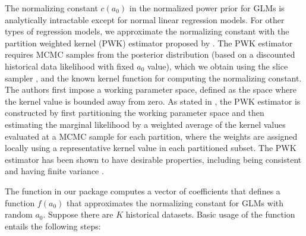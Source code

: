 The normalizing constant $c(a_0)$ in the normalized power prior for GLMs is analytically intractable except for normal linear regression models. For other types of regression models, we approximate the normalizing constant with the partition weighted kernel (PWK) estimator proposed by \cite{pwk_2018}. The PWK estimator requires MCMC samples from the posterior distribution (based on a discounted historical data likelihood with fixed $a_0$ value), which we obtain using the slice sampler \citep{slice}, and the known kernel function for computing the normalizing constant. The authors first impose a working parameter space, defined as the space where the kernel value is bounded away from zero. As stated in \cite{pwk_2018}, the PWK estimator is constructed by first partitioning the working parameter space and then estimating the marginal likelihood by a weighted average of the kernel values evaluated at a MCMC sample for each partition, where the weights are assigned locally using a representative kernel value in each partitioned subset. The PWK estimator has been shown to have desirable properties, including being consistent and having finite variance \citep{pwk_2018}. 

The function  in our package computes a vector of coefficients that defines a function $f(a_0)$ that approximates the normalizing constant for GLMs with random $a_0$. Suppose there are $K$ historical datasets. Basic usage of the  function entails the following steps:

